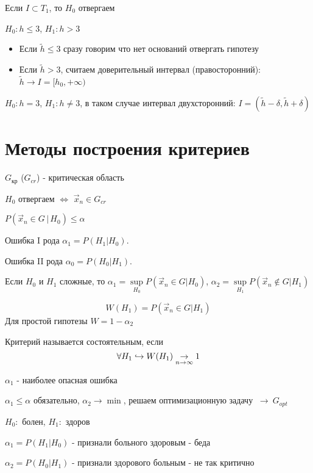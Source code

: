 \documentclass{article}
\begin{document}
Если $I \subset T_1$, то $H_0$ отвергаем
\begin{eg}
  $H_0: h\le 3$, $H_1: h > 3$

  \begin{itemize}
    \item Если $\tilde{h} \le 3$ сразу говорим что нет оснований отвергать гипотезу
    \item Если $\tilde{h} > 3$, считаем доверительный интервал (правосторонний):
      $\tilde{h} \rightarrow I=[h_0, +\infty)$
  \end{itemize}
\end{eg}
\begin{eg}
  $H_0: h=3$, $H_1: h\neq 3$, в таком случае интервал двухсторонний: $I=(\tilde{h}-\delta, \tilde{h}+\delta)$
\end{eg}

\section{Методы построения критериев}
$G_{\text{кр}}$ ($G_{cr}$) - критическая область

$H_0$ отвергаем $\iff$ $\vec{x}_n \in G_{cr}$

$P(\vec{x}_n \in G \, | \, H_0) \le \alpha$ 

Ошибка I рода $\alpha_1=P(H_1 | H_0)$.

Ошибка II рода $\alpha_0=P(H_0 | H_1)$.

Если $H_0$ и $H_1$ сложные, то $\alpha_1=\sup \limits_{H_0} P(\vec{x}_n \in G| H_0)$,
$\alpha_2 = \sup \limits_{H_1} P(\vec{x}_n \not \in G | H_1)$

\begin{definition}
  \[
    W(H_1)= P(\vec{x}_n \in G | H_1)
  \]
  Для простой гипотезы $W=1-\alpha_2$
\end{definition}

\begin{definition}
  Критерий называется состоятельным, если 
  \[
    \forall H_1 \hookrightarrow W(H_1) \underset{n\to\infty}{\to} 1
  \]
\end{definition}

\begin{remark}
  $\alpha_1$ - наиболее опасная ошибка 

  $\alpha_1 \le \alpha$ обязательно, $\alpha_2 \to \min$,
  решаем оптимизационную задачу $ \ \rightarrow \ G_{opt}$
\end{remark}
\begin{eg}
  $H_0:$ болен, $H_1:$ здоров

  $\alpha_1=P(H_1|H_0)$ - признали больного здоровым - беда

  $\alpha_2=P(H_0|H_1)$ - признали здорового больным - не так критично
\end{eg}
\end{document}
